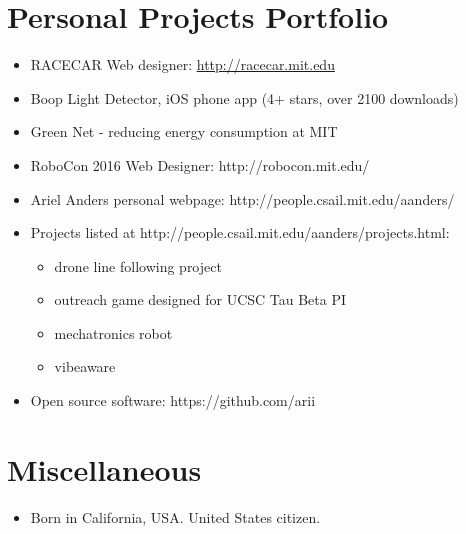 \documentclass[10pt,letterpaper]{article}
\begin{document}
\section*{Personal Projects Portfolio}
\begin{itemize}
\item RACECAR Web designer: \url{http://racecar.mit.edu}
\item Boop Light Detector, iOS phone app (4+ stars, over 2100 downloads)
\item Green Net - reducing energy consumption at MIT
\item RoboCon 2016 Web Designer: http://robocon.mit.edu/
\item Ariel Anders personal webpage: http://people.csail.mit.edu/aanders/
\item Projects listed at http://people.csail.mit.edu/aanders/projects.html:
\begin{itemize}
\item drone line following project
\item outreach game designed for UCSC Tau Beta PI
\item mechatronics robot
\item vibeaware
\end{itemize}
\item Open source software: https://github.com/arii
\end{itemize}

\section*{Miscellaneous}

\begin{itemize}
\item Born in California, USA. United States citizen.
\end{itemize}
\end{document}

